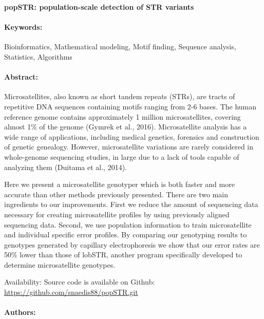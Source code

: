 \noindent
\large {\bf popSTR: population-scale detection of STR variants} 


\normalsize 


\noindent \paragraph{Keywords:} Bioinformatics, Mathematical modeling, Motif finding, Sequence analysis,
Statistics, Algorithms

\noindent \paragraph{Abstract:} 

Microsatellites, also known as short tandem repeats (STRs), are tracts of repetitive
DNA sequences containing motifs ranging from 2-6 bases. The human reference genome contains
approximately 1 million microsatellites, covering almost 1\% of the genome (Gymrek et al., 2016).
Microsatellite analysis has a wide range of applications, including medical genetics, forensics and
construction of genetic genealogy. However, microsatellite variations are rarely considered in whole-genome
 sequencing studies, in large due to a lack of tools capable of analyzing them (Duitama et al., 2014).

 Here we present a microsatellite genotyper which is both faster and more accurate than other
methods previously presented. There are two main ingredients to our improvements. First we reduce
the amount of sequencing data necessary for creating microsatellite profiles by using previously aligned
sequencing data. Second, we use population information to train microsatellite and individual specific
error profiles. By comparing our genotyping results to genotypes generated by capillary electrophoresis
we show that our error rates are 50\% lower than those of lobSTR, another program specifically developed
to determine microsatellite genotypes.

Availability: Source code is available on Github: \url{https://github.com/snaedis88/popSTR.git}

\noindent \paragraph{Authors:} 

\noindent \paragraph{} 

